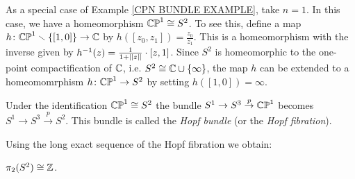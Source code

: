 \begin{example}
\label{HOPF BUNDLE EXAMPLE}
As a special case of Example \ref{CPN BUNDLE EXAMPLE}, take $n=1$. 
In this case, we have a homeomorphism ${\mathbb C\mathbb P}^{1} \cong S^{2}$. 
To see this, define a map $h\colon {\mathbb C\mathbb P}^{1}\smallsetminus \{[1, 0]\}\to {\mathbb C}$ by 
$h([z_{0}, z_{1}]) = \frac{z_{0}}{z_{1}}$. This is a homeomorphism 
with the inverse given by $h^{-1}(z) = \frac{1}{1 + \norm{z}}\cdot [z, 1]$. 
Since $S^{2}$ is homeomorphic to the one-point compactification of ${\mathbb C}$, i.e. 
$S^{2}\cong {\mathbb C} \cup \{\infty\}$, the map $h$ can be extended to a homeomomrphism 
$h\colon  {\mathbb C\mathbb P}^{1}\to S^{2}$ by setting $h([1, 0]) = \infty$.  

Under the identification ${\mathbb C\mathbb P}^{1}\cong S^{2}$ the bundle 
$S^{1}\to S^{3}\overset{p}{\to} {\mathbb C\mathbb P}^{1}$ becomes $S^{1}\to S^{3}\overset{p}{\to} S^{2}$. 
This bundle is called the \emph{Hopf bundle} (or the \emph{Hopf fibration}). 
\end{example}

Using the long exact sequence of the Hopf fibration we obtain:

\begin{theorem}
\label{PI2 S2 THM}
$\pi_{2}(S^{2}) \cong {\mathbb Z}$.
\end{theorem}


